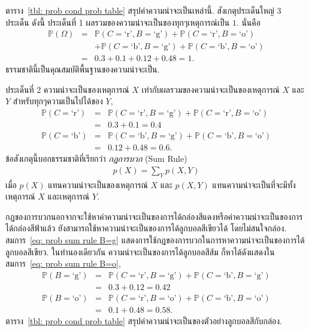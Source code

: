 ตาราง~\ref{tbl: prob cond prob table} สรุปค่าความน่าจะเป็นเหล่านี้.
สังเกตุประเด็นใหญ่ $3$ ประเด็น ดังนี้
ประเด็นที่ 1 ผลรวมของความน่าจะเป็นของทุกๆเหตุการณ์เป็น $1$. 
นั่นคือ
\begin{eqnarray}
\mathbb{P}(\Omega) &=& \mathbb{P}(C = \mbox{`r'}, B = \mbox{`g'})
  + \mathbb{P}(C = \mbox{`r'}, B = \mbox{`o'})
\nonumber \\
&\;&  
  + \mathbb{P}(C = \mbox{`b'}, B = \mbox{`g'})
  + \mathbb{P}(C = \mbox{`b'}, B = \mbox{`o'})    
\nonumber \\
&=& 0.3 + 0.1 + 0.12 + 0.48 = 1
\nonumber .
\end{eqnarray}
ธรรมชาตินี้เป็นคุณสมบัติพื้นฐานของความน่าจะเป็น.

ประเด็นที่ 2 ความน่าจะเป็นของเหตุการณ์ $X$ เท่ากับผลรวมของความน่าจะเป็นของเหตุการณ์ $X$ และ $Y$ สำหรับทุกๆความเป็นไปได้ของ $Y$,
\begin{eqnarray}
  \mathbb{P}(C = \mbox{`r'}) &=& \mathbb{P}(C = \mbox{`r'}, B = \mbox{`g'}) + \mathbb{P}(C = \mbox{`r'}, B = \mbox{`o'})
\label{eq: prob sum rule C=r} \\
  &=& 0.3 + 0.1 = 0.4
\nonumber \\
  \mathbb{P}(C = \mbox{`b'}) &=& \mathbb{P}(C = \mbox{`b'}, B = \mbox{`g'}) + \mathbb{P}(C = \mbox{`b'}, B = \mbox{`o'})
\label{eq: prob sum rule C=b} \\
  &=& 0.12 + 0.48 = 0.6
\nonumber .
\end{eqnarray}
ข้อสังเกตุนี้บอกธรรมชาติที่เรียกว่า \textit{กฏการบวก} (Sum Rule) 
\begin{eqnarray}
  p(X) = \sum_Y p(X,Y)
\label{eq: prop sum rule}  
\end{eqnarray}
เมื่อ $p(X)$ แทนความน่าจะเป็นของเหตุการณ์ $X$ และ
$p(X,Y)$ แทนความน่าจะเป็นที่จะมีทั้งเหตุการณ์ $X$ และเหตุการณ์ $Y$. 

กฏของการบวกนอกจากจะใช้หาค่าความน่าจะเป็นของการได้กล่องสีแดงหรือค่าความน่าจะเป็นของการได้กล่องสีฟ้าแล้ว
ยังสามารถใช้หาความน่าจะเป็นของการได้ลูกบอลสีเขียวได้ โดยไม่สนใจกล่อง.
สมการ~\ref{eq: prob sum rule B=g} แสดงการใช้กฏของการบวกในการหาความน่าจะเป็นของการได้ลูกบอลสีเขียว.
ในทำนองเดียวกัน ความน่าจะเป็นของการได้ลูกบอลสีส้ม ก็หาได้ดังแสดงในสมการ~\ref{eq: prob sum rule B=o},
\begin{eqnarray}
  \mathbb{P}(B = \mbox{`g'}) &=& \mathbb{P}(C = \mbox{`r'}, B = \mbox{`g'}) + \mathbb{P}(C = \mbox{`b'}, B = \mbox{`g'})
\label{eq: prob sum rule B=g} \\
&=& 0.3 + 0.12 = 0.42
\nonumber \\
  \mathbb{P}(B = \mbox{`o'}) &=& \mathbb{P}(C = \mbox{`r'}, B = \mbox{`o'}) + \mathbb{P}(C = \mbox{`b'}, B = \mbox{`o'})
\label{eq: prob sum rule B=o} \\
&=& 0.1 + 0.48 = 0.58
\nonumber .
\end{eqnarray}
ตาราง~\ref{tbl: prob cond prob table} สรุปค่าความน่าจะเป็นของตัวอย่างลูกบอลสีกับกล่อง.

